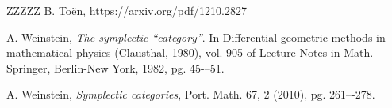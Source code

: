 \documentclass[11pt, a4paper]{amsart}
\numberwithin{equation}{section}
\theoremstyle{definition}
\theoremstyle{remark}
\begin{document}
\begin{thebibliography}{ZZZZZ}
B. To\"en,
https://arxiv.org/pdf/1210.2827

A. Weinstein, 
\textit{The symplectic “category”}. 
In Differential geometric methods in mathematical physics (Clausthal, 1980),
vol. 905 of Lecture Notes in Math. Springer, Berlin-New York, 1982, pg. 45-–51.

A. Weinstein, 
\textit{Symplectic categories},
Port. Math. 67, 2 (2010), pg. 261–-278.

\end{thebibliography}
\end{document}
